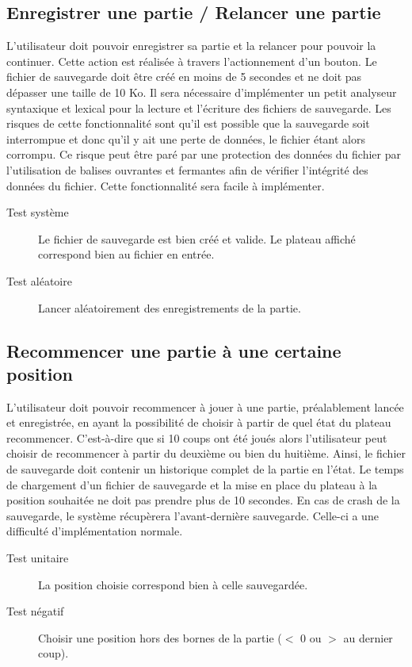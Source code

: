 \subsection{Enregistrer une partie / Relancer une partie}
L'utilisateur doit pouvoir enregistrer sa partie et la relancer pour pouvoir la continuer. Cette action est réalisée à travers l’actionnement d’un bouton. Le fichier de sauvegarde doit être créé en moins de 5 secondes et ne doit pas dépasser une taille de 10 Ko. Il sera nécessaire d'implémenter un petit analyseur syntaxique et lexical pour la lecture et l'écriture des fichiers de sauvegarde. Les risques de cette fonctionnalité sont qu'il est possible que la sauvegarde soit interrompue et donc qu'il y ait une perte de données, le fichier étant alors corrompu. Ce risque peut être paré par une protection des données du fichier par l'utilisation de balises ouvrantes et fermantes afin de vérifier l'intégrité des données du fichier. Cette fonctionnalité sera facile à implémenter.

\begin{description}
\item[Test système] Le fichier de sauvegarde est bien créé et valide. Le plateau affiché correspond bien au fichier en entrée.
\item[Test aléatoire] Lancer aléatoirement des enregistrements de la partie.
\end{description}

\subsection{Recommencer une partie à une certaine position}
L’utilisateur doit pouvoir recommencer à jouer à une partie, préalablement lancée et enregistrée, en ayant la possibilité de choisir à partir de quel état du plateau recommencer. C’est-à-dire que si 10 coups ont été joués alors l’utilisateur peut choisir de recommencer à partir du deuxième ou bien du huitième. Ainsi, le fichier de sauvegarde doit contenir un historique complet de la partie en l'état. Le temps de chargement d'un fichier de sauvegarde et la mise en place du plateau à la position souhaitée ne doit pas prendre plus de 10 secondes. En cas de crash de la sauvegarde, le système récupèrera l'avant-dernière sauvegarde. Celle-ci a une difficulté d'implémentation normale.

\begin{description}
\item[Test unitaire] La position choisie correspond bien à celle sauvegardée.
\item[Test négatif] Choisir une position hors des bornes de la partie ($<$ 0 ou $>$ au dernier coup).
\end{description}

